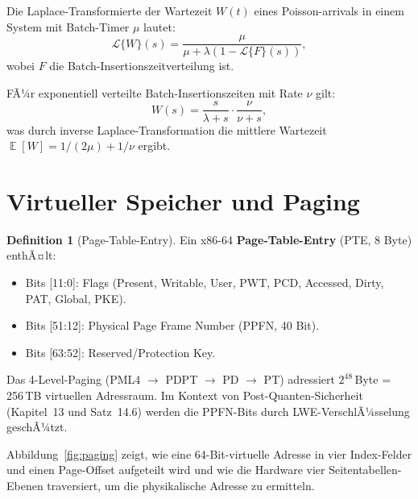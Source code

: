 ﻿\documentclass[a4paper,12pt]{scrreprt}
\theoremstyle{definition}
\newtheorem{definition}{Definition}[chapter]
\DeclareMathOperator{\E}{\mathbb{E}}
\begin{document}
	Die Laplace-Transformierte der Wartezeit $W(t)$ eines Poisson-arrivals
	in einem System mit Batch-Timer $\mu$ lautet:
	\[
	\mathcal{L}\{W\}(s) = \frac{\mu}{\mu + \lambda(1 - \mathcal{L}\{F\}(s))},
	\]
	wobei $F$ die Batch-Insertionszeitverteilung ist.
	
	FÃ¼r exponentiell verteilte Batch-Insertionszeiten mit Rate $\nu$ gilt:
	\[
	W(s) = \frac{s}{\lambda + s} \cdot \frac{\nu}{\nu + s},
	\]
	was durch inverse Laplace-Transformation die mittlere Wartezeit
	$\E[W] = 1/(2\mu) + 1/\nu$ ergibt.
	
	\section{Virtueller Speicher und Paging}

	\begin{definition}[Page-Table-Entry]
		Ein x86-64 \textbf{Page-Table-Entry} (PTE, 8 Byte) enthÃ¤lt:
		\begin{itemize}
			\item Bits [11:0]: Flags (Present, Writable, User, PWT, PCD, Accessed,
			Dirty, PAT, Global, PKE).
			\item Bits [51:12]: Physical Page Frame Number (PPFN, 40 Bit).
			\item Bits [63:52]: Reserved/Protection Key.
		\end{itemize}
	\end{definition}

	Das 4-Level-Paging (PML4 $\to$ PDPT $\to$ PD $\to$ PT) adressiert
	$2^{48}$\,Byte = 256\,TB virtuellen Adressraum. Im Kontext von
	Post-Quanten-Sicherheit (Kapitel~13 und Satz~14.6) werden die PPFN-Bits
	durch LWE-VerschlÃ¼sselung geschÃ¼tzt.

	Abbildung~\ref{fig:paging} zeigt, wie eine 64-Bit-virtuelle Adresse in
	vier Index-Felder und einen Page-Offset aufgeteilt wird und wie die
	Hardware vier Seitentabellen-Ebenen traversiert, um die physikalische
	Adresse zu ermitteln.
\end{document}
